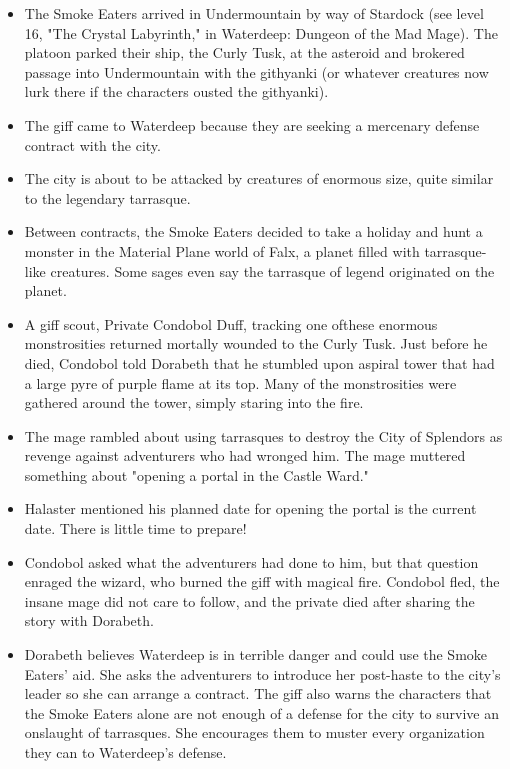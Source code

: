 \documentclass[10pt,a4paper,twoside,bg=print,twocolumn,openany,nodeprecatedcode]{dndbook}
\begin{document}
\begin{itemize}
\item The Smoke Eaters arrived in Undermountain by way of Stardock (see level 16, "The Crystal Labyrinth," in Waterdeep: Dungeon of the Mad Mage). The platoon parked their ship, the Curly Tusk, at the asteroid and brokered passage into Undermountain with the githyanki (or whatever creatures now lurk there if the characters ousted the githyanki).
\item The giff came to Waterdeep because they are seeking a mercenary defense contract with the city.
\item The city is about to be attacked by creatures of enormous size, quite similar to the legendary tarrasque.
\item Between contracts, the Smoke Eaters decided to take a holiday and hunt a monster in the Material Plane world of Falx, a planet filled with tarrasque-like creatures. Some sages even say the tarrasque of legend originated on the planet.
\item A giff scout, Private Condobol Duff, tracking one ofthese enormous monstrosities returned mortally wounded to the Curly Tusk. Just before he died, Condobol told Dorabeth that he stumbled upon aspiral tower that had a large pyre of purple flame at its top. Many of the monstrosities were gathered around the tower, simply staring into the fire.
\item The mage rambled about using tarrasques to destroy the City of Splendors as revenge against adventurers who had wronged him. The mage muttered something about "opening a portal in the Castle Ward."
\item Halaster mentioned his planned date for opening the portal is the current date. There is little time to prepare!
\item Condobol asked what the adventurers had done to him, but that question enraged the wizard, who burned the giff with magical fire. Condobol fled, the insane mage did not care to follow, and the private died after sharing the story with Dorabeth.
\item Dorabeth believes Waterdeep is in terrible danger and could use the Smoke Eaters' aid. She asks the adventurers to introduce her post-haste to the city's leader so she can arrange a contract. The giff also warns the characters that the Smoke Eaters alone are not enough of a defense for the city to survive an onslaught of tarrasques. She encourages them to muster every organization they can to Waterdeep's defense.
\end{itemize}
\end{document}
